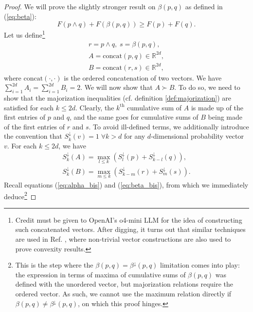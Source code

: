 \begin{proof} \label{proof:alternative_supermodularity}
    We will prove the slightly stronger result on $\beta(p, q)$ as defined in (\ref{eq:beta}):
    \begin{equation} \label{eq:beta_supermodularity}
        F(p \wedge q) + F(\beta(p, q)) \geq F(p) + F(q).
    \end{equation}
    Let us define\footnote{Credit must be given to OpenAI's o4-mini LLM for the idea of constructing such concatenated vectors. After digging, it turns out that similar techniques are used in Ref. \cite[pp. 133--136]{marshall_inequalities_2011}, where non-trivial vector constructions are also used to prove convexity results.}
    \begin{gather}
        r = p \wedge q, \; s = \beta(p, q), \\
        A = \text{concat}(p, q) \in \mathbb{R}^{2d}, \\
        B = \text{concat}(r, s) \in \mathbb{R}^{2d},
    \end{gather}
    where $\text{concat}(\cdot, \cdot)$ is the ordered concatenation of two vectors. We have $\sum_{i=1}^{2d} A_i = \sum_{i=1}^{2d} B_i = 2$. We will now show that $A \succ B$. To do so, we need to show that the majorization inequalities (cf. definition \ref{def:majorization}) are satisfied for each $k \leq 2d$. Clearly, the $k^{\text{th}}$ cumulative sum of $A$ is made up of the first entries of $p$ and $q$, and the same goes for cumulative sums of $B$ being made of the first entries of $r$ and $s$. To avoid ill-defined terms, we additionally introduce the convention that $S^\downarrow_k (v) = 1 \; \forall k > d$ for any $d$-dimensional probability vector $v$. For each $k \leq 2d$, we have
    \begin{gather}
        S^\downarrow_k (A) = \max_{l\leq k} \left(S^\downarrow_l (p) + S^\downarrow_{k-l} (q)\right), \\
        S^\downarrow_k (B) = \max_{m\leq k} \left(S^\downarrow_{k-m} (r)+ S^\downarrow_m (s)\right).
    \end{gather} %
    Recall equations (\ref{eq:alpha_bis}) and (\ref{eq:beta_bis}), from which we immediately deduce\footnote{This is the step where the $\beta(p, q) = \beta^\downarrow(p, q)$ limitation comes into play: the expression in terms of maxima of cumulative sums of $\beta(p, q)$ was defined with the unordered vector, but majorization relations require the ordered vector. As such, we cannot use the maximum relation directly if $\beta(p, q) \neq \beta^\downarrow(p, q)$, on which this proof hinges.}

\end{proof}
